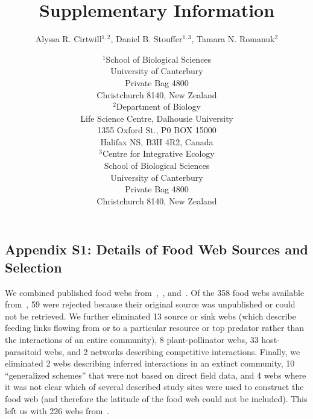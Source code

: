 \documentclass[12pt]{article}
\newcommand{\beginsupplement}{%
        \setcounter{table}{0}
        \renewcommand{\thetable}{S\arabic{table}}%
        \setcounter{figure}{0}
        \renewcommand{\thefigure}{S\arabic{figure}}%
     }
\begin{document}
\title{Supplementary Information}
\author{Alyssa R. Cirtwill$^{1,2}$, Daniel B. Stouffer$^{1,3}$, Tamara N. Romanuk$^{2}$}
\date{\footnotesize$^1$School of Biological Sciences\\University of Canterbury\\
Private Bag 4800\\Christchurch 8140, New Zealand \\
\medskip$^2$Department of Biology\\
Life Science Centre, Dalhousie University\\1355 Oxford St., P0 BOX 15000\\
Halifax NS, B3H 4R2, Canada\\
\medskip$^3$Centre for Integrative Ecology\\School of Biological Sciences\\University of Canterbury\\
Private Bag 4800\\Christchurch 8140, New Zealand \\}



\maketitle
\baselineskip=8.5mm

\vspace{0.4 in}
\beginsupplement
\linenumbers
\subsection*{Appendix S1: Details of Food Web Sources and Selection}

  We combined published food webs from~\citet{GlobalWeb},~\citet{Riede2011},
  and~\citet{Dunne2013}. Of the 358 food webs available
  from~\citet{GlobalWeb}, 59 were rejected because their original source was
  unpublished or could not be retrieved. We further eliminated 13 source or
  sink webs (which describe feeding links flowing from or to a particular
  resource or top predator rather than the interactions of an entire
  community), 8 plant-pollinator webs, 33 host-parasitoid webs, and 2 networks
  describing competitive interactions. Finally, we eliminated 2 webs
  describing  inferred interactions in an extinct community, 10 ``generalized
  schemes'' that were not based on direct field data, and 4 webs where it was
  not clear which of several described study sites were used to construct the
  food web (and therefore the latitude of the food web could not be
  included). This left us with 226 webs from~\citet{GlobalWeb}.
\end{document}
